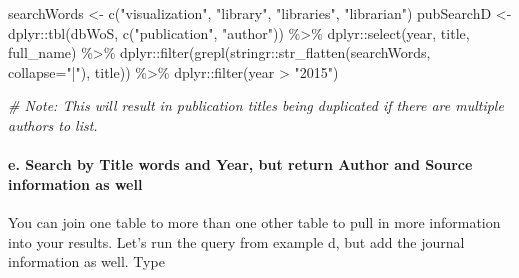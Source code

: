 \documentclass[
]{article}
\newenvironment{Shaded}{\begin{snugshade}}{\end{snugshade}}
\newcommand{\AttributeTok}[1]{\textcolor[rgb]{0.77,0.63,0.00}{#1}}
\newcommand{\CommentTok}[1]{\textcolor[rgb]{0.56,0.35,0.01}{\textit{#1}}}
\newcommand{\FunctionTok}[1]{\textcolor[rgb]{0.00,0.00,0.00}{#1}}
\newcommand{\NormalTok}[1]{#1}
\newcommand{\OtherTok}[1]{\textcolor[rgb]{0.56,0.35,0.01}{#1}}
\newcommand{\SpecialCharTok}[1]{\textcolor[rgb]{0.00,0.00,0.00}{#1}}
\newcommand{\StringTok}[1]{\textcolor[rgb]{0.31,0.60,0.02}{#1}}
\begin{document}
\begin{Shaded}
\begin{Highlighting}[]
\NormalTok{searchWords }\OtherTok{\textless{}{-}} \FunctionTok{c}\NormalTok{(}\StringTok{"visualization"}\NormalTok{, }\StringTok{"library"}\NormalTok{, }\StringTok{"libraries"}\NormalTok{, }\StringTok{"librarian"}\NormalTok{)}
\NormalTok{pubSearchD }\OtherTok{\textless{}{-}}\NormalTok{ dplyr}\SpecialCharTok{::}\FunctionTok{tbl}\NormalTok{(dbWoS, }\FunctionTok{c}\NormalTok{(}\StringTok{"publication"}\NormalTok{, }\StringTok{"author"}\NormalTok{)) }\SpecialCharTok{\%\textgreater{}\%}
\NormalTok{  dplyr}\SpecialCharTok{::}\FunctionTok{select}\NormalTok{(year, title, full\_name) }\SpecialCharTok{\%\textgreater{}\%}
\NormalTok{  dplyr}\SpecialCharTok{::}\FunctionTok{filter}\NormalTok{(}\FunctionTok{grepl}\NormalTok{(stringr}\SpecialCharTok{::}\FunctionTok{str\_flatten}\NormalTok{(searchWords, }\AttributeTok{collapse=}\StringTok{"|"}\NormalTok{), title)) }\SpecialCharTok{\%\textgreater{}\%}
\NormalTok{  dplyr}\SpecialCharTok{::}\FunctionTok{filter}\NormalTok{(year }\SpecialCharTok{\textgreater{}} \StringTok{"2015"}\NormalTok{)}

\CommentTok{\# Note: This will result in publication titles being duplicated if there are multiple authors to list.}
\end{Highlighting}
\end{Shaded}

\hypertarget{e.-search-by-title-words-and-year-but-return-author-and-source-information-as-well}{%
\paragraph{e. Search by Title words and Year, but return Author and
Source information as
well}\label{e.-search-by-title-words-and-year-but-return-author-and-source-information-as-well}}

You can join one table to more than one other table to pull in more
information into your results. Let's run the query from example d, but
add the journal information as well. Type
\end{document}
